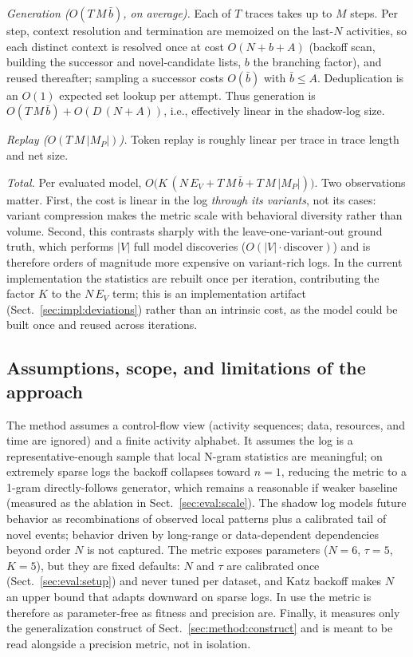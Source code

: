 \documentclass[runningheads]{llncs}
\newcommand{\chg}[1]{\textcolor{chgblue}{#1}}
\begin{document}
\emph{Generation ($O(T\,M\,\bar b)$, on average).} Each of $T$ traces takes up to $M$ steps. Per step, context resolution and termination are memoized on the last-$N$ activities, so each distinct context is resolved once at cost $O(N+b+A)$ (backoff scan, building the successor and novel-candidate lists, $b$ the branching factor), and reused thereafter; sampling a successor costs $O(\bar b)$ with $\bar b\le A$. Deduplication is an $O(1)$ expected set lookup per attempt. Thus generation is $O(T\,M\,\bar b)+O(D\,(N+A))$, i.e., effectively linear in the shadow-log size.

\emph{Replay ($O(T\,M\,|M_P|)$).} Token replay is roughly linear per trace in trace length and net size.

\emph{Total.} Per evaluated model, $O\!\big(K\,(N\,E_V + T\,M\,\bar b + T\,M\,|M_P|)\big)$. Two observations matter. First, the cost is linear in the log \emph{through its variants}, not its cases: variant compression makes the metric scale with behavioral diversity rather than volume. Second, this contrasts sharply with the leave-one-variant-out ground truth, which performs $|V|$ full model discoveries ($O(|V|\cdot\mathrm{discover})$) and is therefore orders of magnitude more expensive on variant-rich logs. In the current implementation the statistics are rebuilt once per iteration, contributing the factor $K$ to the $N\,E_V$ term; this is an implementation artifact (Sect.~\ref{sec:impl:deviations}) rather than an intrinsic cost, as the model could be built once and reused across iterations.

\subsection{Assumptions, scope, and limitations of the approach}
\label{sec:method:scope}
The method assumes a control-flow view (activity sequences; data, resources, and time are ignored) and a finite activity alphabet. It assumes the log is a representative-enough sample that local N-gram statistics are meaningful; on extremely sparse logs the backoff collapses toward $n{=}1$, reducing the metric to a 1-gram directly-follows generator, which remains a reasonable if weaker baseline \chg{(measured as the ablation in Sect.~\ref{sec:eval:scale})}. The shadow log models future behavior as recombinations of observed local patterns plus a calibrated tail of novel events; behavior driven by long-range or data-dependent dependencies beyond order $N$ is not captured. The metric exposes parameters ($N{=}6$, $\tau{=}5$, $K{=}5$), but they are fixed defaults: $N$ and $\tau$ are calibrated once (Sect.~\ref{sec:eval:setup}) and never tuned per dataset, and Katz backoff makes $N$ an upper bound that adapts downward on sparse logs. In use the metric is therefore as parameter-free as fitness and precision are. Finally, it measures only the generalization construct of Sect.~\ref{sec:method:construct} and is meant to be read alongside a precision metric, not in isolation.
\end{document}
